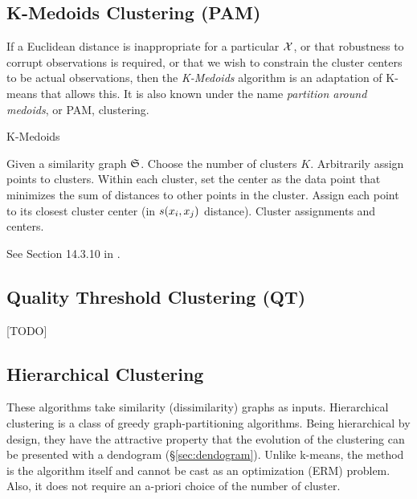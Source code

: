 \subsection{K-Medoids Clustering (PAM)}
\label{sec:k_medoids}



If a Euclidean distance is inappropriate for a particular $\mathcal{X}$, or that robustness to corrupt observations is required, or that we wish to constrain the cluster centers to be actual observations, then the \emph{K-Medoids} algorithm is an adaptation of K-means that allows this.
It is also known under the name \emph{partition around medoids}, or PAM, clustering.

\begin{algorithm}[H]
\caption{K-Medoids}
\begin{algorithmic}
\State Given a similarity graph $\mathfrak{S}$.
\State Choose the number of clusters $K$.
\State Arbitrarily assign points to clusters.
	\State Within each cluster, set the center as the data point that minimizes the sum of distances to other points in the cluster.
	\State Assign each point to its closest cluster center (in $s(x_i,x_j)$ distance).
\EndWhile
\State \Return Cluster assignments and centers.
\end{algorithmic}
\end{algorithm}


See Section 14.3.10 in \cite{hastie_elements_2003}.




\subsection{Quality Threshold Clustering (QT)}
[TODO]
\label{sec:qt_clustering}



\subsection{Hierarchical Clustering}
\label{sec:hierarchical}



These algorithms take similarity (dissimilarity) graphs as inputs.
Hierarchical clustering is a class of greedy graph-partitioning algorithms. 
Being hierarchical by design, they have the attractive property that the evolution of the clustering can be presented with a dendogram (\S\ref{sec:dendogram}).  
Unlike k-means, the method is the algorithm itself and cannot be cast as an optimization (ERM) problem.
Also, it does not require an a-priori choice of the number of cluster.


